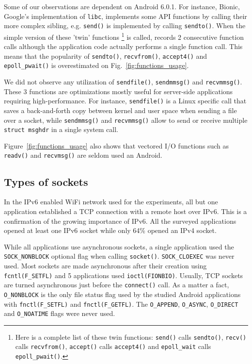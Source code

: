 Some of our observations are dependent on Android 6.0.1. For instance,
Bionic, Google's implementation of \texttt{libc},
implements some API functions by calling their more complex sibling,
e.g. \texttt{send()} is implemented by calling \texttt{sendto()}. When the
simple version of these 'twin' functions \footnote{Here is a complete list of
these twin functions: \texttt{send()} calls \texttt{sendto()}, \texttt{recv()}
calls \texttt{recvfrom()}, \texttt{accept()} calls \texttt{accept4()} and
\texttt{epoll\_wait} calls \texttt{epoll\_pwait()}.} is called, \tcpsnitch
records 2 consecutive function calls although the application code actually
performs a single function call. This means that the popularity of
\texttt{sendto()}, \texttt{recvfrom()}, \texttt{accept4()} and
\texttt{epoll\_pwait()} is overestimated on Fig.~\ref{fig:functions_usage}.

We did not observe any utilization of \texttt{sendfile()}, \texttt{sendmmsg()}
and \texttt{recvmmsg()}. These 3 functions are optimizations
mostly useful for server-side applications requiring high-performance.
For instance, \texttt{sendfile()} is a Linux specific call that saves 
a back-and-forth copy between kernel
and user space when sending a file over a socket, while \texttt{sendmmsg()} and
\texttt{recvmmsg()} allow to send or receive multiple \texttt{struct msghdr}
in a single system call.

Figure~\ref{fig:functions_usage} also shows that vectored I/O functions such as
\texttt{readv()} and \texttt{recvmsg()} are seldom used an Android.

\subsection{Types of sockets}

In the IPv6 enabled WiFi network used for the experiments, all but one application
established a TCP connection with a remote host over IPv6. This is a
confirmation of the growing importance of IPv6. All the surveyed
applications opened at least one IPv6 socket while only 64\% opened an IPv4
socket.

While all applications use asynchronous sockets, a single application used the
\texttt{SOCK\_NONBLOCK} optional flag when calling \texttt{socket()}.
\texttt{SOCK\_CLOEXEC} was never used. Most sockets are made asynchronous after
their creation using \texttt{fcntl(F\_SETFL)} and 5 applications used
\texttt{ioctl(FIONBIO)}. Usually, TCP sockets are turned asynchronous just
before the \texttt{connect()} call. As a matter a fact, \texttt{O\_NONBLOCK} is
the only file status flag used by the studied Android applications with
\texttt{fnctl(F\_SETFL)} and \texttt{fnctl(F\_GETFL)}. The \texttt{O\_APPEND},
\texttt{O\_ASYNC}, \texttt{O\_DIRECT} and \texttt{O\_NOATIME} flags were never
used.
